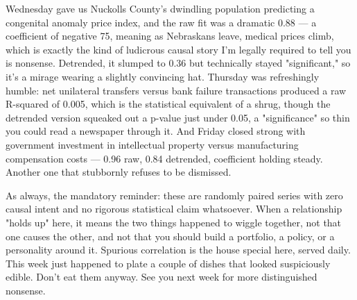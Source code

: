Wednesday gave us Nuckolls County's dwindling population predicting a congenital anomaly price index, and the raw fit was a dramatic 0.88 — a coefficient of negative 75, meaning as Nebraskans leave, medical prices climb, which is exactly the kind of ludicrous causal story I'm legally required to tell you is nonsense. Detrended, it slumped to 0.36 but technically stayed "significant," so it's a mirage wearing a slightly convincing hat. Thursday was refreshingly humble: net unilateral transfers versus bank failure transactions produced a raw R-squared of 0.005, which is the statistical equivalent of a shrug, though the detrended version squeaked out a p-value just under 0.05, a "significance" so thin you could read a newspaper through it. And Friday closed strong with government investment in intellectual property versus manufacturing compensation costs — 0.96 raw, 0.84 detrended, coefficient holding steady. Another one that stubbornly refuses to be dismissed.

As always, the mandatory reminder: these are randomly paired series with zero causal intent and no rigorous statistical claim whatsoever. When a relationship "holds up" here, it means the two things happened to wiggle together, not that one causes the other, and not that you should build a portfolio, a policy, or a personality around it. Spurious correlation is the house special here, served daily. This week just happened to plate a couple of dishes that looked suspiciously edible. Don't eat them anyway. See you next week for more distinguished nonsense.
